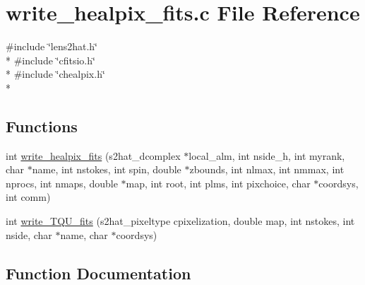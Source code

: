 \section{write\-\_\-healpix\-\_\-fits.\-c File Reference}
\label{common_2write__healpix__fits_8c}
{\ttfamily \#include \char`\"{}lens2hat.\-h\char`\"{}}\\*
{\ttfamily \#include \char`\"{}cfitsio.\-h\char`\"{}}\\*
{\ttfamily \#include \char`\"{}chealpix.\-h\char`\"{}}\\*
\subsection*{Functions}
\begin{DoxyCompactItemize}
\item 
int \hyperlink{common_2write__healpix__fits_8c_a0e8ef872d4ff0df61ae71499c14bc1fb}{write\-\_\-healpix\-\_\-fits} (s2hat\-\_\-dcomplex $\ast$local\-\_\-alm, int nside\-\_\-h, int myrank, char $\ast$name, int nstokes, int spin, double $\ast$zbounds, int nlmax, int nmmax, int nprocs, int nmaps, double $\ast$map, int root, int plms, int pixchoice, char $\ast$coordsys, int comm)
\item 
int \hyperlink{common_2write__healpix__fits_8c_ab55406f86af043b6b0440218eb38789f}{write\-\_\-\-T\-Q\-U\-\_\-fits} (s2hat\-\_\-pixeltype cpixelization, double map, int nstokes, int nside, char $\ast$name, char $\ast$coordsys)
\end{DoxyCompactItemize}


\subsection{Function Documentation}
